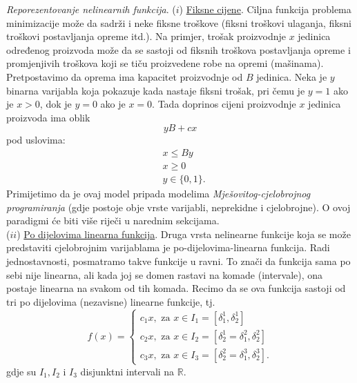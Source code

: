 \documentclass[a4paper, utf8, 11pt, colorlinks]{book}
\begin{document}
\emph{Reporezentovanje nelinearnih funkcija}. ($i$) \underline{Fiksne cijene}. Ciljna funkcija problema minimizacije može da sadrži i neke fiksne troškove (fiksni troškovi ulaganja, fiksni troškovi postavljanja opreme itd.). Na primjer, trošak proizvodnje $x$ jedinica određenog proizvoda može da se sastoji od fiksnih troškova postavljanja opreme i promjenjivih troškova koji se tiču proizvedene robe na opremi (mašinama). Pretpostavimo da oprema ima kapacitet proizvodnje od $B$ jedinica. Neka je $y$ binarna varijabla koja pokazuje kada nastaje fiksni trošak, pri čemu  je $y=1$ ako je $x >0$, dok je $y=0$ ako je $x=0$. Tada doprinos cijeni proizvodnje $x$ jedinica proizvoda ima oblik 
$$ yB + c x $$ pod uslovima:
\begin{align}
     &x \leq By \\
     & x \geq 0 \\
     & y \in \{0, 1\}.
\end{align}
Primijetimo da je ovaj model pripada modelima \emph{Mješovitog-cjelobrojnog programiranja} (gdje postoje obje vrste varijabli, neprekidne i cjelobrojne). O ovoj paradigmi će biti više riječi u narednim sekcijama. \\
($ii$) \underline{{Po dijelovima linearna funkcija}}. Druga vrsta nelinearne funkcije koja se može predstaviti cjelobrojnim varijablama je po-dijelovima-linearna funkcija. Radi jednostavnosti, posmatramo takve funkcije u ravni. To znači da funkcija sama po sebi nije linearna, ali kada joj se domen rastavi na komade (intervale), ona postaje linearna na svakom od tih komada. Recimo da se ova funkcija sastoji od tri po dijelovima (nezavisne) linearne funkcije, tj. 
$$f(x) = \begin{cases}
          c_1 x, \mbox{ za } x \in I_1 = [\delta^1_1, \delta^1_2] \\
          c_2 x, \mbox{ za } x \in I_2 = [\delta^1_2 = \delta^2_1, \delta^2_2] \\
          c_3 x, \mbox{ za } x \in I_3 = [\delta^2_2 = \delta^3_1, \delta^3_2].
      \end{cases}
$$
gdje su $I_1, I_2$ i $I_3$ disjunktni intervali na $\mathbb{R}$.
\end{document}
